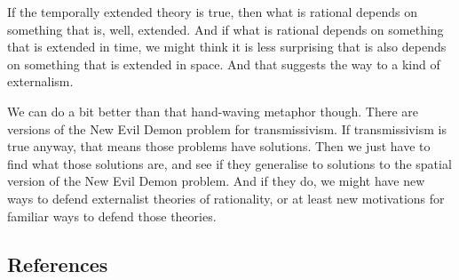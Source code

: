 \documentclass[
  11pt,
  letterpaper,
  DIV=11,
  numbers=noendperiod,
  twoside]{scrartcl}
\begin{document}
If the temporally extended theory is true, then what is rational depends
on something that is, well, extended. And if what is rational depends on
something that is extended in time, we might think it is less surprising
that is also depends on something that is extended in space. And that
suggests the way to a kind of externalism.

We can do a bit better than that hand-waving metaphor though. There are
versions of the New Evil Demon problem for transmissivism. If
transmissivism is true anyway, that means those problems have solutions.
Then we just have to find what those solutions are, and see if they
generalise to solutions to the spatial version of the New Evil Demon
problem. And if they do, we might have new ways to defend externalist
theories of rationality, or at least new motivations for familiar ways
to defend those theories.

\subsection*{References}\label{references}
\end{document}
